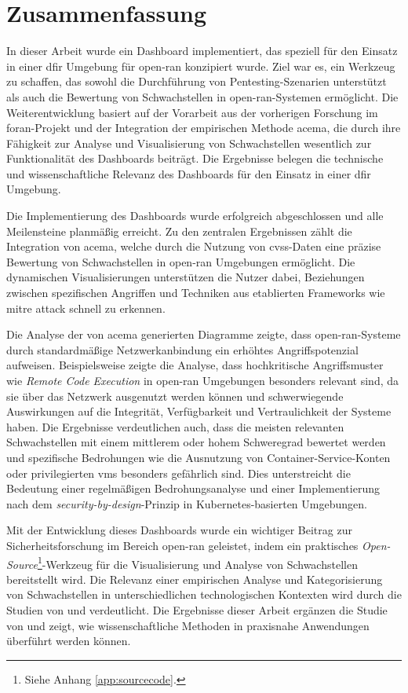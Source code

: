 \chapter{Zusammenfassung}
\label{chap:zusammenfassung}
In dieser Arbeit wurde ein Dashboard implementiert, das speziell für den Einsatz in einer \gls{dfir} Umgebung für \gls{open-ran} konzipiert wurde. Ziel war es, ein Werkzeug zu schaffen, das sowohl die Durchführung von Pentesting-Szenarien unterstützt als auch die Bewertung von Schwachstellen in \gls{open-ran}-Systemen ermöglicht. Die Weiterentwicklung basiert auf der Vorarbeit aus der vorherigen Forschung im \gls{foran}-Projekt und der Integration der empirischen Methode \gls{acema}, die durch ihre Fähigkeit zur Analyse und Visualisierung von Schwachstellen wesentlich zur Funktionalität des Dashboards beiträgt. Die Ergebnisse belegen die technische und wissenschaftliche Relevanz des Dashboards für den Einsatz in einer \gls{dfir} Umgebung.

Die Implementierung des Dashboards wurde erfolgreich abgeschlossen und alle Meilensteine planmäßig erreicht. Zu den zentralen Ergebnissen zählt die Integration von \gls{acema}, welche durch die Nutzung von \gls{cvss}-Daten eine präzise Bewertung von Schwachstellen in \gls{open-ran} Umgebungen ermöglicht. Die dynamischen Visualisierungen unterstützen die Nutzer dabei, Beziehungen zwischen spezifischen Angriffen und Techniken aus etablierten Frameworks wie \gls{mitre} \gls{attack} schnell zu erkennen.

Die Analyse der von \gls{acema} generierten Diagramme zeigte, dass \gls{open-ran}-Systeme durch standardmäßige Netzwerkanbindung ein erhöhtes Angriffspotenzial aufweisen. Beispielsweise zeigte die Analyse, dass hochkritische Angriffsmuster wie \textit{Remote Code Execution} in \gls{open-ran} Umgebungen besonders relevant sind, da sie über das Netzwerk ausgenutzt werden können und schwerwiegende Auswirkungen auf die Integrität, Verfügbarkeit und Vertraulichkeit der Systeme haben. Die Ergebnisse verdeutlichen auch, dass die meisten relevanten Schwachstellen mit einem mittlerem oder hohem Schweregrad bewertet werden und spezifische Bedrohungen wie die Ausnutzung von Container-Service-Konten oder privilegierten \glspl{vm} besonders gefährlich sind. Dies unterstreicht die Bedeutung einer regelmäßigen Bedrohungsanalyse und einer Implementierung nach dem \textit{security-by-design}-Prinzip in Kubernetes-basierten Umgebungen.

Mit der Entwicklung dieses Dashboards wurde ein wichtiger Beitrag zur Sicherheitsforschung im Bereich \gls{open-ran} geleistet, indem ein praktisches \textit{Open-Source}\footnote{Siehe Anhang \ref{app:sourcecode}.}-Werkzeug für die Visualisierung und Analyse von Schwachstellen bereitstellt wird. Die Relevanz einer empirischen Analyse und Kategorisierung von Schwachstellen in unterschiedlichen technologischen Kontexten wird durch die Studien von \autocite{mazuera-rozoAndroidOSStack2019} und \autocite{klementSecuring6GTransition2024} verdeutlicht. Die Ergebnisse dieser Arbeit ergänzen die Studie von \citeauthor{klementSecuring6GTransition2024} und zeigt, wie wissenschaftliche Methoden in praxisnahe Anwendungen überführt werden können.

